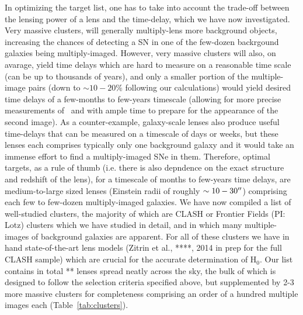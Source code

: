 In optimizing the target list, one has to take into account the trade-off between the lensing power of a lens and the time-delay, which we have now investigated. Very massive clusters, will generally multiply-lens more background objects, increasing the chances of detecting a SN in one of the few-dozen backrgound galaxies being multiply-imaged. However, very massive clusters will also, on avarage, yield time delays which are hard to measure on a reasonable time scale (can be up to thousands of years), and only a smaller portion of the multiple-image pairs (down to $\sim10-20\%$ following our calculations) would yield desired time delays of a few-months to few-years timescale (allowing for more precise measurements of \dt~and with ample time to prepare for the
appearance of the second image). As a counter-example, galaxy-scale lenses also produce useful time-delays that can be measured on a timescale of days or weeks, but these lenses each comprises typically only one background galaxy and it would take an immense effort to find a multiply-imaged SNe in them. Therefore, optimal targets, as a rule of thumb (i.e. there is also depndence on the exact structure and redshift of the lens), for a timescale of months to few-years time delays, are medium-to-large sized lenses (Einstein radii of roughly $\sim10-30^{\prime\prime}$) comprising each few to few-dozen multiply-imaged galaxies.  We have now compiled a list of well-studied clusters, the majority of which are CLASH or Frontier Fields (PI: Lotz) clusters which we have studied in detail, and in which many multiple-images of background galaxies are apparent. For all of these clusters we have in hand state-of-the-art lens models (Zitrin et al., ****, 2014 in prep for the full CLASH sample) which are crucial for the accurate determination of H$_{0}$. Our list contains in total ** lenses spread neatly across the sky, the bulk of which is designed to follow the selection criteria specified above, but supplemented by 2-3 more massive clusters for completeness comprising an order of a hundred multiple images each (Table~\ref{tab:clusters}). 

